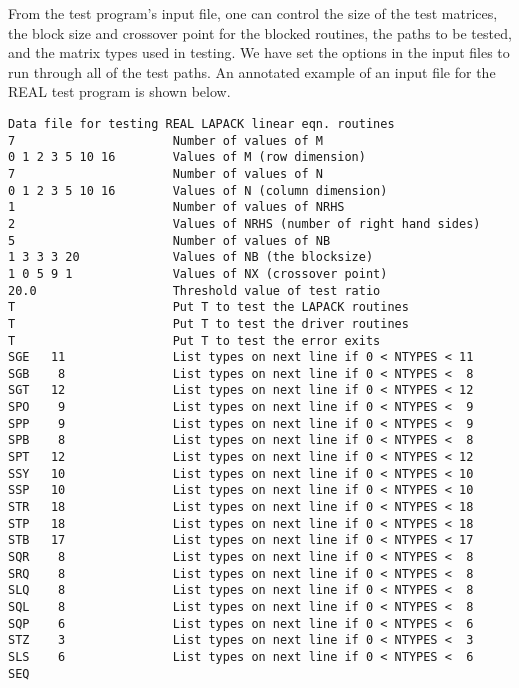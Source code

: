 \dent
From the test program's input file, one can control
the size of the test matrices,
the block size and crossover point for the blocked routines,
the paths to be tested,
and the matrix types used in testing.  
We have set the options in the input files to run through all of
the test paths.  
An annotated example of an input file for the REAL 
test program is shown below.

\begin{verbatim}
Data file for testing REAL LAPACK linear eqn. routines
7                      Number of values of M
0 1 2 3 5 10 16        Values of M (row dimension)
7                      Number of values of N
0 1 2 3 5 10 16        Values of N (column dimension)
1                      Number of values of NRHS
2                      Values of NRHS (number of right hand sides)
5                      Number of values of NB
1 3 3 3 20             Values of NB (the blocksize)
1 0 5 9 1              Values of NX (crossover point)
20.0                   Threshold value of test ratio
T                      Put T to test the LAPACK routines
T                      Put T to test the driver routines
T                      Put T to test the error exits
SGE   11               List types on next line if 0 < NTYPES < 11
SGB    8               List types on next line if 0 < NTYPES <  8
SGT   12               List types on next line if 0 < NTYPES < 12
SPO    9               List types on next line if 0 < NTYPES <  9
SPP    9               List types on next line if 0 < NTYPES <  9
SPB    8               List types on next line if 0 < NTYPES <  8
SPT   12               List types on next line if 0 < NTYPES < 12
SSY   10               List types on next line if 0 < NTYPES < 10
SSP   10               List types on next line if 0 < NTYPES < 10
STR   18               List types on next line if 0 < NTYPES < 18
STP   18               List types on next line if 0 < NTYPES < 18
STB   17               List types on next line if 0 < NTYPES < 17
SQR    8               List types on next line if 0 < NTYPES <  8
SRQ    8               List types on next line if 0 < NTYPES <  8
SLQ    8               List types on next line if 0 < NTYPES <  8
SQL    8               List types on next line if 0 < NTYPES <  8
SQP    6               List types on next line if 0 < NTYPES <  6
STZ    3               List types on next line if 0 < NTYPES <  3
SLS    6               List types on next line if 0 < NTYPES <  6
SEQ
\end{verbatim}


